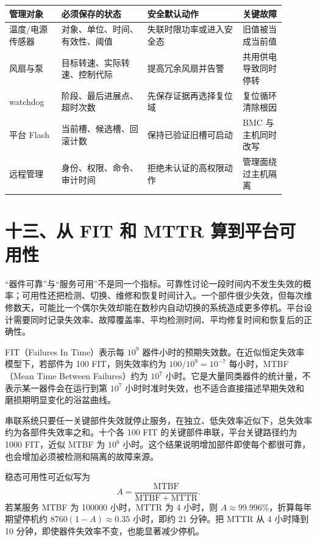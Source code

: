 \begin{longtable}{L{0.17\linewidth}L{0.28\linewidth}L{0.31\linewidth}L{0.14\linewidth}}
\toprule
管理对象 & 必须保存的状态 & 安全默认动作 & 关键故障 \\
\midrule
温度/电源传感器 & 对象、单位、时间、有效性、阈值 & 失联时限功率或进入安全态 & 旧值被当成当前值 \\\tablerowrule
风扇与泵 & 目标转速、实际转速、控制代际 & 提高冗余风扇并告警 & 共用供电导致同时停转 \\\tablerowrule
watchdog & 阶段、最后进展点、超时次数 & 先保存证据再选择复位域 & 复位循环清除根因 \\\tablerowrule
平台 Flash & 当前槽、候选槽、回滚计数 & 保持已验证旧槽可启动 & BMC 与主机同时改写 \\\tablerowrule
远程管理 & 身份、权限、命令、审计时间 & 拒绝未认证的高权限动作 & 管理面绕过主机隔离 \\
\bottomrule
\end{longtable}

\section{十三、从 FIT 和 MTTR 算到平台可用性}

“器件可靠”与“服务可用”不是同一个指标。可靠性讨论一段时间内不发生失效的概率；可用性还把检测、切换、维修和恢复时间计入。一个部件很少失效，但每次维修数天，可能比一个偶尔失效却能在数秒内自动切换的系统造成更多停机。平台设计需要同时记录失效率、故障覆盖率、平均检测时间、平均修复时间和恢复后的正确性。


FIT（Failures In Time）表示每 $10^9$ 器件小时的预期失效数。在近似恒定失效率模型下，若部件为 100 FIT，则失效率约为 $100/10^9=10^{-7}$ 每小时，MTBF（Mean Time Between Failures）约为 $10^7$ 小时。它是大量同类器件的统计量，不表示某一器件会在运行到第 $10^7$ 小时时准时失效，也不适合直接描述早期失效和磨损期明显变化的浴盆曲线。

串联系统只要任一关键部件失效就停止服务，在独立、低失效率近似下，总失效率约为各部件失效率之和。十个各 100 FIT 的关键部件串联，平台关键路径约为 1000 FIT，近似 MTBF 为 $10^6$ 小时。这个结果说明增加部件即使每个都很可靠，也会增加必须被检测和隔离的故障来源。


稳态可用性可近似写为
\[
A=\frac{\mathrm{MTBF}}{\mathrm{MTBF}+\mathrm{MTTR}}.
\]
若某服务 MTBF 为 100000 小时，MTTR 为 4 小时，则 $A\approx99.996\%$，折算每年期望停机约 $8760(1-A)\approx0.35$ 小时，即约 21 分钟。把 MTTR 从 4 小时降到 10 分钟，即使器件失效率不变，也能显著减少停机。

